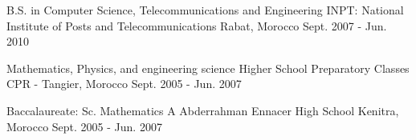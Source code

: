 

\begin{cventries}

  \cvedu
    {B.S. in Computer Science, Telecommunications and Engineering} %
    {INPT: National Institute of Posts and Telecommunications} %
    {Rabat, Morocco} %
    {Sept. 2007 - Jun. 2010} %
    {}

  \cvedu
    {Mathematics, Physics, and engineering science} %
    {Higher School Preparatory Classes} %
    {CPR - Tangier, Morocco} %
    {Sept. 2005 - Jun. 2007} %
    {}

  \cvedu
    {Baccalaureate: Sc. Mathematics A} %
    {Abderrahman Ennacer High School} %
    {Kenitra, Morocco} %
    {Sept. 2005 - Jun. 2007} %
    {}

\end{cventries}
